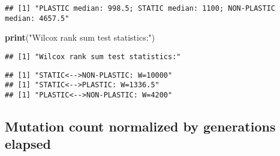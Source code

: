 \documentclass[]{book}
\newenvironment{Shaded}{\begin{snugshade}}{\end{snugshade}}
\newcommand{\ControlFlowTok}[1]{\textcolor[rgb]{0.13,0.29,0.53}{\textbf{#1}}}
\newcommand{\DataTypeTok}[1]{\textcolor[rgb]{0.13,0.29,0.53}{#1}}
\newcommand{\DecValTok}[1]{\textcolor[rgb]{0.00,0.00,0.81}{#1}}
\newcommand{\KeywordTok}[1]{\textcolor[rgb]{0.13,0.29,0.53}{\textbf{#1}}}
\newcommand{\NormalTok}[1]{#1}
\newcommand{\OperatorTok}[1]{\textcolor[rgb]{0.81,0.36,0.00}{\textbf{#1}}}
\newcommand{\OtherTok}[1]{\textcolor[rgb]{0.56,0.35,0.01}{#1}}
\newcommand{\StringTok}[1]{\textcolor[rgb]{0.31,0.60,0.02}{#1}}
\begin{document}
\begin{verbatim}
## [1] "PLASTIC median: 998.5; STATIC median: 1100; NON-PLASTIC median: 4657.5"
\end{verbatim}

\begin{Shaded}
\begin{Highlighting}[]
\KeywordTok{print}\NormalTok{(}\StringTok{"Wilcox rank sum test statistics:"}\NormalTok{)}
\end{Highlighting}
\end{Shaded}

\begin{verbatim}
## [1] "Wilcox rank sum test statistics:"
\end{verbatim}

\begin{Shaded}
\end{Shaded}

\begin{verbatim}
## [1] "STATIC<-->NON-PLASTIC: W=10000"
## [1] "STATIC<-->PLASTIC: W=1336.5"
## [1] "PLASTIC<-->NON-PLASTIC: W=4200"
\end{verbatim}

\hypertarget{mutation-count-normalized-by-generations-elapsed}{%
\subsection{Mutation count normalized by generations elapsed}\label{mutation-count-normalized-by-generations-elapsed}}
\end{document}
